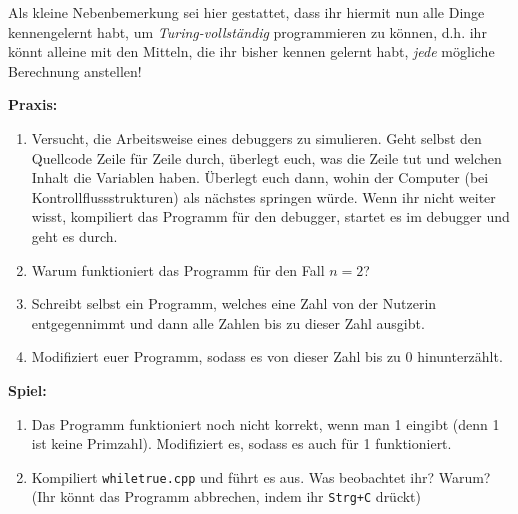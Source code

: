 Als kleine Nebenbemerkung sei hier gestattet, dass ihr hiermit nun alle Dinge
kennengelernt habt, um \emph{Turing-vollständig} programmieren zu können, d.h.
ihr könnt alleine mit den Mitteln, die ihr bisher kennen gelernt habt,
\emph{jede} mögliche Berechnung anstellen!

\textbf{Praxis:}
\begin{enumerate}
    \item Versucht, die Arbeitsweise eines debuggers zu simulieren. Geht selbst
          den Quellcode Zeile für Zeile durch, überlegt euch, was die Zeile tut
          und welchen Inhalt die Variablen haben. Überlegt euch dann, wohin der
          Computer (bei Kontrollflussstrukturen) als nächstes springen würde.
          Wenn ihr nicht weiter wisst, kompiliert das Programm für den debugger,
          startet es im debugger und geht es durch.
    \item Warum funktioniert das Programm für den Fall $n = 2$?
    \item Schreibt selbst ein Programm, welches eine Zahl von der Nutzerin
          entgegennimmt und dann alle Zahlen bis zu dieser Zahl ausgibt.
    \item Modifiziert euer Programm, sodass es von dieser Zahl bis zu 0
          hinunterzählt.
\end{enumerate}

\textbf{Spiel:}
\begin{enumerate}
    \item Das Programm funktioniert noch nicht korrekt, wenn man 1 eingibt
          (denn 1 ist keine Primzahl). Modifiziert es, sodass es auch für 1
          funktioniert.
    \item Kompiliert \texttt{whiletrue.cpp} und führt es aus. Was beobachtet
          ihr? Warum? (Ihr könnt das Programm abbrechen, indem ihr
          \texttt{Strg+C} drückt)
\end{enumerate}

